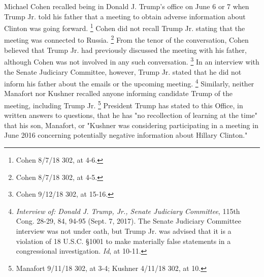 Michael Cohen recalled being in Donald J. Trump's office on June 6 or 7 when Trump Jr. told his father that a meeting to obtain adverse information about Clinton was going forward.%
\footnote{Cohen 8/7/18 302, at 4-6.}
Cohen did not recall Trump Jr. stating that the meeting was connected to Russia.%
\footnote{Cohen 8/7/18 302, at 4-5.}
From the tenor of the conversation, Cohen believed that Trump Jr. had previously discussed the meeting with his father, although Cohen was not involved in any such conversation.%
\footnote{Cohen 9/12/18 302, at 15-16.}
In an interview with the Senate Judiciary Committee, however, Trump Jr. stated that he did not inform his father about the emails or the upcoming meeting.%
\footnote{\textit{Interview of: Donald J. Trump, Jr., Senate Judiciary Committee}, 115th Cong. 28-29, 84, 94-95
(Sept. 7, 2017).
The Senate Judiciary Committee interview was not under oath, but Trump Jr. was advised that it is a violation of 18 U.S.C. \S 1001 to make materially false statements in a congressional investigation.
\textit{Id}, at 10-11.}
Similarly, neither Manafort nor Kushner recalled anyone informing candidate Trump of the meeting, including Trump Jr.%
\footnote{Manafort 9/11/18 302, at 3-4;
Kushner 4/11/18 302, at 10.}
President Trump has stated to this Office, in written answers to questions, that he has "no recollection of learning at the time" that his son, Manafort, or "Kushner was considering participating in a meeting in June 2016 concerning potentially negative information about Hillary Clinton."%
